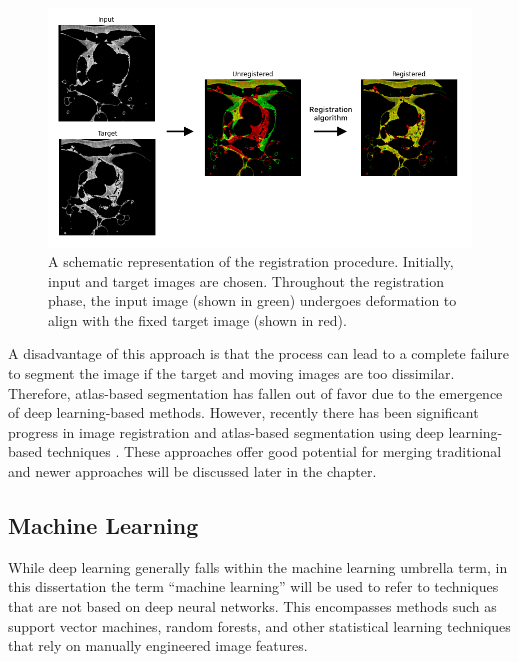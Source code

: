 \begin{figure}[t!]
 \centering
 \includegraphics[width=0.7\linewidth]{images/registration.png}
 \caption{A schematic representation of the registration procedure. Initially, input and target images are chosen. Throughout the registration phase, the input image (shown in green) undergoes deformation to align with the fixed target image (shown in red). \cite{bencevicRecentProgressEpicardial2022}}
 \label{fig:registration}
 \end{figure}

A disadvantage of this approach is that the process can lead to a complete failure to segment the image if the target and moving images are too dissimilar. Therefore, atlas-based segmentation has fallen out of favor due to the emergence of deep learning-based methods. However, recently there has been significant progress in image registration and atlas-based segmentation using deep learning-based techniques \cite{sinclairAtlasISTNJointSegmentation2022a}. These approaches offer good potential for merging traditional and newer approaches will be discussed later in the chapter.

\subsection{Machine Learning}

While deep learning generally falls within the machine learning umbrella term, in this dissertation the term ``machine learning'' will be used to refer to techniques that are not based on deep neural networks. This encompasses methods such as support vector machines, random forests, and other statistical learning techniques that rely on manually engineered image features.

